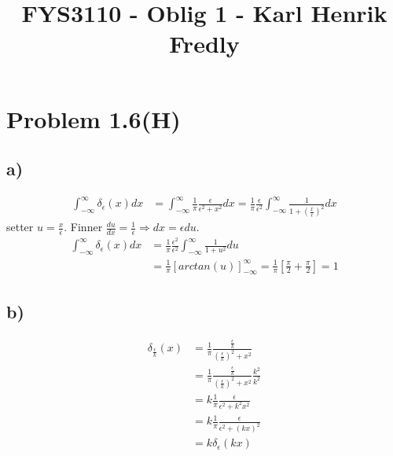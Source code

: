 \documentclass[norsk,a4paper,12pt]{article}
\title{FYS3110 - Oblig 1 - Karl Henrik Fredly}
\begin{document}
	
	\maketitle
	
	\section*{Problem 1.6(H)}
	
	\subsection*{a)}
	\begin{equation}
	\begin{aligned}
	\int_{-\infty}^{\infty}\delta_\epsilon(x)dx &=
	\int_{-\infty}^{\infty}\frac{1}{\pi} \frac{\epsilon}{\epsilon^2 + x^2}dx =
	\frac{1}{\pi} \frac{\epsilon}{\epsilon^2}\int_{-\infty}^{\infty} \frac{1}{1 + (\frac{x}{\epsilon})^2}dx
	\end{aligned}
	\end{equation}
	setter $u = \frac{x}{\epsilon}$. Finner $\frac{du}{dx} = \frac{1}{\epsilon} \Rightarrow dx = \epsilon du$.
	\begin{equation}
	\begin{aligned}
	\int_{-\infty}^{\infty}\delta_\epsilon(x)dx &=
	\frac{1}{\pi} \frac{\epsilon^2}{\epsilon^2}\int_{-\infty}^{\infty} \frac{1}{1 + u^2}du \\
	&= \frac{1}{\pi} [arctan(u)]_{-\infty}^{\infty} = \frac{1}{\pi} [\frac{\pi}{2} + \frac{\pi}{2}] = 1
	\end{aligned}
	\end{equation}
	
	\subsection*{b)}
	\begin{equation}
	\begin{aligned}
	\delta_\frac{\epsilon}{k}(x) &= \frac{1}{\pi} \frac{\frac{\epsilon}{k}}{(\frac{\epsilon}{k})^2 + x^2} \\
	&= \frac{1}{\pi} \frac{\frac{\epsilon}{k}}{(\frac{\epsilon}{k})^2 + x^2} \frac{k^2}{k^2} \\
	&= k\frac{1}{\pi} \frac{\epsilon}{\epsilon^2 + k^2x^2} \\
	&= k\frac{1}{\pi} \frac{\epsilon}{\epsilon^2 + (kx)^2} \\
	&= k \delta_\epsilon(kx)
	\end{aligned}
	\end{equation}
	
\end{document}
